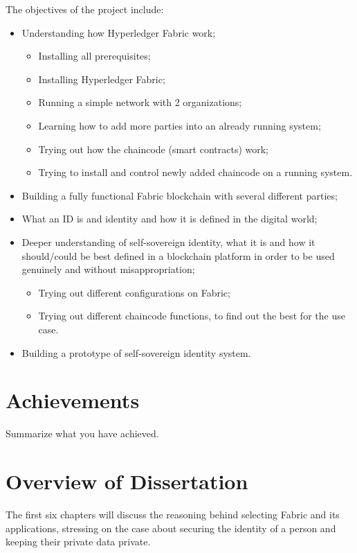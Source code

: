 \documentclass[a4paper,11pt]{report}
\begin{document}
The objectives of the project include:  
\begin{itemize}
\item Understanding how Hyperledger Fabric work;
	\begin{itemize}
	\item Installing all prerequisites;
	\item Installing Hyperledger Fabric; 
	\item Running a simple network with 2 organizations; 
	\item Learning how to add more parties into an already running system;
	\item Trying out how the chaincode (smart contracts) work;
	\item Trying to install and control newly added chaincode on a running system.
	\end{itemize}
\item Building a fully functional Fabric blockchain with several different parties;
\item What an ID is  and identity and how it is defined in the digital world;
\item Deeper understanding of self-sovereign identity, what it is and how it should/could be best defined in a blockchain platform in order to be used genuinely and without misappropriation;
	\begin{itemize}
	\item Trying out different configurations on Fabric;
	\item Trying out different chaincode functions, to find out the best for the use case.
	\end{itemize}
\item Building a prototype of self-sovereign identity system.

\end{itemize}



\section{Achievements}

\label{introduction-achievements}

Summarize what you have achieved.

\section{Overview of Dissertation}

The first six chapters will discuss the reasoning behind selecting Fabric and its applications, stressing on the case about securing the identity of a person and keeping their private data private. 
\end{document}
